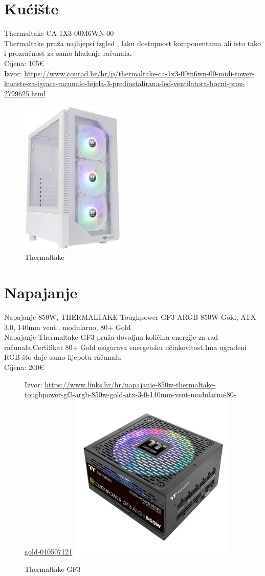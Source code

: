 \documentclass{report}
\begin{document}
\chapter{Kućište}
Thermaltake CA-1X3-00M6WN-00
\\ Thermaltake pruža najlijepsi izgled , laku dostupnost komponentama ali isto tako i prozračnost za samo hlađenje računala.
\\Cijena: 105€
\\Izvor:  \url{https://www.conrad.hr/hr/p/thermaltake-ca-1x3-00m6wn-00-midi-tower-kuciste-za-igrace-racunalo-bijela-3-predinstalirana-led-ventilatora-bocni-proz-2799625.html}
\begin{figure}[h]
\includegraphics[width=5cm]{slike/kuciste.jpg}
\caption{Thermaltake}
\end{figure}

\chapter{Napajanje}
Napajanje 850W, THERMALTAKE Toughpower GF3 ARGB 850W Gold, ATX 3.0, 140mm vent., modularno, 80+ Gold
\\Napajanje Thermaltake GF3 pruža dovoljnu količinu energije za rad računala.Certifikat 80+ Gold osigurava energetsku učinkovitost.Ima ugrađeni RGB što daje samo lijepotu računalu
\\Cijena: 200€
\begin{figure}[h]
Izvor:  \url{https://www.links.hr/hr/napajanje-850w-thermaltake-toughpower-gf3-argb-850w-gold-atx-3-0-140mm-vent-modularno-80-gold-010507121}
\includegraphics[width=8cm]{slike/napajanje.jpg}
\caption{Thermaltake GF3}
\end{figure}
\end{document}
